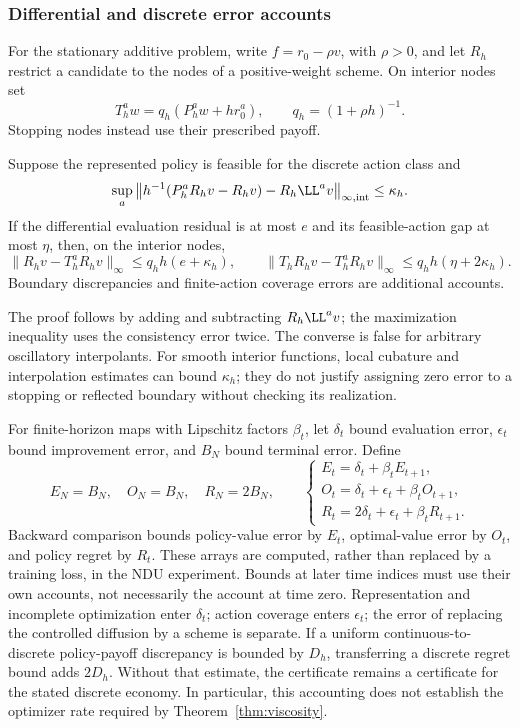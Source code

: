 \subsubsection{Differential and discrete error accounts}\label{sec:bridge-r6}
For the stationary additive problem, write $f=r_0-\rho v$, with $\rho>0$, and let $R_h$ restrict a candidate to the nodes of a positive-weight scheme. On interior nodes set
\[
 T_h^a w=q_h(P_h^aw+h r_0^a),\qquad q_h=(1+\rho h)^{-1}.
\]
Stopping nodes instead use their prescribed payoff.
\begin{proposition}\label{prop:bridge-r6}
Suppose the represented policy is feasible for the discrete action class and
\[
 \sup_a\left\|h^{-1}(P_h^aR_hv-R_hv)-R_h\LL^av\right\|_{\infty,\mathrm{int}}\leq\kappa_h.
\]
If the differential evaluation residual is at most $e$ and its feasible-action gap at most $\eta$, then, on the interior nodes,
\[
 \|R_hv-T_h^aR_hv\|_\infty\leq q_hh(e+\kappa_h),\qquad
 \|T_hR_hv-T_h^aR_hv\|_\infty\leq q_hh(\eta+2\kappa_h).
\]
Boundary discrepancies and finite-action coverage errors are additional accounts.
\end{proposition}
The proof follows by adding and subtracting $R_h\LL^av$; the maximization inequality uses the consistency error twice. The converse is false for arbitrary oscillatory interpolants. For smooth interior functions, local cubature and interpolation estimates can bound $\kappa_h$; they do not justify assigning zero error to a stopping or reflected boundary without checking its realization.

For finite-horizon maps with Lipschitz factors $\beta_t$, let $\delta_t$ bound evaluation error, $\epsilon_t$ bound improvement error, and $B_N$ bound terminal error. Define
\begin{equation}\label{eq:accounts-r6}
 E_N=B_N,\quad O_N=B_N,\quad R_N=2B_N,\qquad
 \begin{cases}
 E_t=\delta_t+\beta_t E_{t+1},\\
 O_t=\delta_t+\epsilon_t+\beta_t O_{t+1},\\
 R_t=2\delta_t+\epsilon_t+\beta_t R_{t+1}.
 \end{cases}
\end{equation}
Backward comparison bounds policy-value error by $E_t$, optimal-value error by $O_t$, and policy regret by $R_t$. These arrays are computed, rather than replaced by a training loss, in the NDU experiment. Bounds at later time indices must use their own accounts, not necessarily the account at time zero. Representation and incomplete optimization enter $\delta_t$; action coverage enters $\epsilon_t$; the error of replacing the controlled diffusion by a scheme is separate. If a uniform continuous-to-discrete policy-payoff discrepancy is bounded by $D_h$, transferring a discrete regret bound adds $2D_h$. Without that estimate, the certificate remains a certificate for the stated discrete economy. In particular, this accounting does not establish the optimizer rate required by Theorem~\ref{thm:viscosity}.
